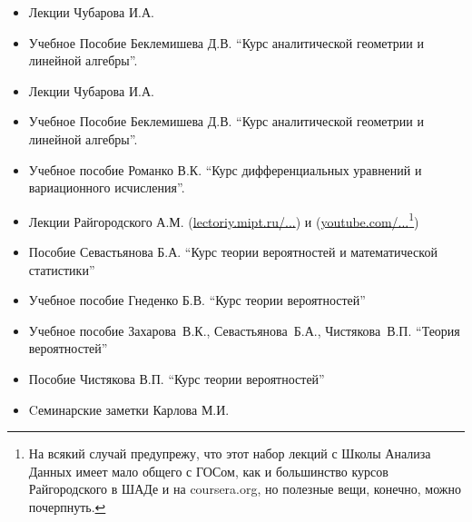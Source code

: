 \begin{samepage}
\begin{itemize}[wide,  labelwidth=!, noitemsep, label=$\blacktriangleright$, labelindent = 0pt]
\item
Лекции Чубарова И.А. 
\item
Учебное Пособие Беклемишева Д.В. ``Курс аналитической геометрии и линейной алгебры''.
\end{itemize}
\end{samepage}

\begin{itemize}[wide,  labelwidth=!, noitemsep, label=$\blacktriangleright$, labelindent = 0pt]
\item
Лекции Чубарова И.А. 
\item
Учебное Пособие Беклемишева Д.В. ``Курс аналитической геометрии и линейной алгебры''.
\end{itemize}

\begin{itemize}[wide,  labelwidth=!, noitemsep, label=$\blacktriangleright$, labelindent = 0pt]
\item
Учебное пособие Романко В.К. ``Курс дифференциальных уравнений и вариационного исчисления''.
\end{itemize}

\begin{itemize}[wide,  labelwidth=!, noitemsep, label=$\blacktriangleright$, labelindent = 0pt]
\item
Лекции Райгородского А.М. (\href{http://lectoriy.mipt.ru/course/Maths-ProbabilityTheoryBasics-L15}{lectoriy.mipt.ru/...}) и (\href{https://www.youtube.com/playlist?list=PLJOzdkh8T5kouOIbZDCqzB72hBn9T7gsJ}{youtube.com/...\footnote{На всякий случай предупрежу, что этот набор лекций с Школы Анализа Данных имеет мало общего с ГОСом, как и большинство курсов Райгородского в ШАДе и на \href{https://www.coursera.org}{coursera.org}, но полезные вещи, конечно, можно почерпнуть.}})
\item
Пособие Севастьянова Б.А. ``Курс теории вероятностей и математической статистики''
\item
Учебное пособие Гнеденко Б.В. ``Курс теории вероятностей''
\item 
Учебное пособие Захарова~В.К., Севастьянова~Б.А., Чистякова~В.П. ``Теория вероятностей''
\item
Пособие Чистякова В.П. ``Курс теории вероятностей''
\item
Cеминарские заметки Карлова М.И.
\end{itemize}

